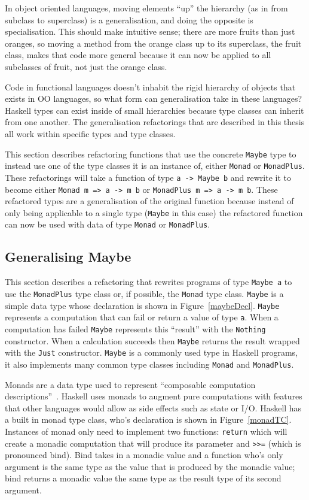 In object oriented languages, moving elements ``up'' the hierarchy (as in from subclass to superclass) is a generalisation, and doing the opposite is specialisation. This should make intuitive sense; there are more fruits than just oranges, so moving a method from the orange class up to its superclass, the fruit class, makes that code more general because it can now be applied to all subclasses of fruit, not just the orange class.

Code in functional languages doesn't inhabit the rigid hierarchy of objects that exists in OO languages, so what form can generalisation take in these languages? Haskell types can exist inside of small hierarchies because type classes can inherit from one another. The generalisation refactorings that are described in this thesis all work within specific types and type classes. 

This section describes refactoring functions that use the concrete \texttt{Maybe} type to instead use one of the type classes it is an instance of, either \texttt{Monad} or \texttt{MonadPlus}. These refactorings will take a function of type \texttt{a -> Maybe b} and rewrite it to become either \texttt{Monad m => a -> m b} or \texttt{MonadPlus m => a -> m b}. These refactored types are a generalisation of the original function because instead of only being applicable to a single type (\texttt{Maybe} in this case) the refactored function can now be used with data of type \texttt{Monad} or \texttt{MonadPlus}.

\subsection{Generalising Maybe}

This section describes a refactoring that rewrites programs of type \texttt{Maybe a} to use the \texttt{MonadPlus} type class or, if possible, the \texttt{Monad} type class. \texttt{Maybe} is a simple data type whose declaration is shown in Figure~\ref{maybeDecl}. \texttt{Maybe} represents a computation that can fail or return a value of type \texttt{a}. When a computation has failed \texttt{Maybe} represents this ``result'' with the \texttt{Nothing} constructor. When a calculation succeeds then \texttt{Maybe} returns the result wrapped with the \texttt{Just} constructor. \texttt{Maybe} is a commonly used type in Haskell programs, it also implements many common type classes including \texttt{Monad} and \texttt{MonadPlus}.

Monads are a data type used to represent ``composable computation descriptions''~\citep{haskellWikiMonad}. Haskell uses monads to augment pure computations with features that other languages would allow as side effects such as state or I/O. Haskell has a built in monad type class, who's declaration is shown in Figure~\ref{monadTC}. Instances of monad only need to implement two functions: \texttt{return} which will create a monadic computation that will produce its parameter and \texttt{>>=} (which is pronounced bind). Bind takes in a monadic value and a function who's only argument is the same type as the value that is produced by the monadic value; bind returns a monadic value the same type as the result type of its second argument.  

